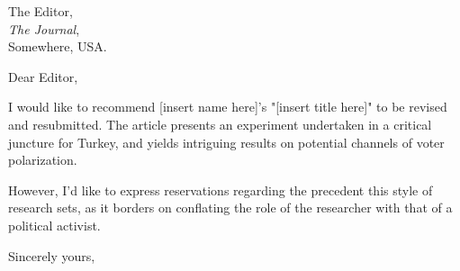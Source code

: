 \documentclass[a4paper, 12pt]{letter}
\begin{document}
\begin{letter}
{
    The Editor,\\
    \textit{The Journal},\\
    Somewhere, USA.
}

\opening{Dear Editor,}


I would like to recommend [insert name here]'s "[insert title here]" to be revised and resubmitted. The article presents an experiment undertaken in a critical juncture for Turkey, and yields intriguing results on potential channels of voter polarization. 

However, I'd like to express reservations regarding the precedent this style of research sets, as it borders on conflating the role of the researcher with that of a political activist.

\closing{Sincerely yours,}

\end{letter}
\end{document}

